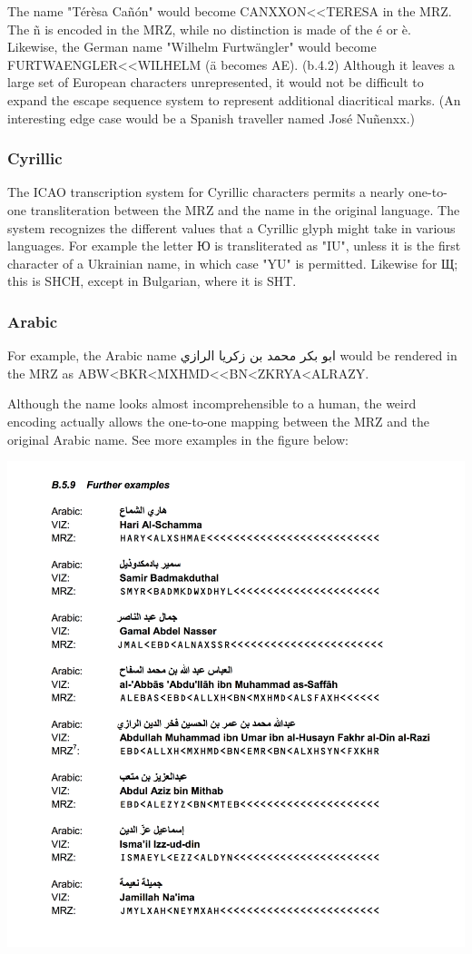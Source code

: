 The name "Térèsa Cañón" would become CANXXON<<TERESA in the MRZ. The ñ is
encoded in the MRZ, while no distinction is made of the é or è. Likewise, the
German name "Wilhelm Furtwängler" would become FURTWAENGLER<<WILHELM (ä becomes
AE). (b.4.2) Although it leaves a large set of European characters
unrepresented, it would not be difficult to expand the escape sequence system to
represent additional diacritical marks. (An interesting edge case would be a
Spanish traveller named José Nuñenxx.)

\subsubsection{Cyrillic}

The ICAO transcription system for Cyrillic characters permits a nearly
one-to-one transliteration between the MRZ and the name in the original
language. The system recognizes the different values that a Cyrillic glyph might
take in various languages. For example the letter Ю is transliterated as "IU",
unless it is the first character of a Ukrainian name, in which case "YU" is
permitted. Likewise for Щ; this is SHCH, except in Bulgarian, where it is SHT.

\subsubsection{Arabic}

For example, the Arabic name {\arfont ابو بكر محمد بن زكريا الرازي} would be
rendered in the MRZ as ABW<BKR<MXHMD<<BN<ZKRYA<ALRAZY.

Although the name looks almost incomprehensible to a human, the weird encoding
actually allows the one-to-one mapping between the MRZ and the original Arabic
name. See more examples in the figure below:

\includegraphics{subtex/9309.3-appendix-b.5.9.png}

